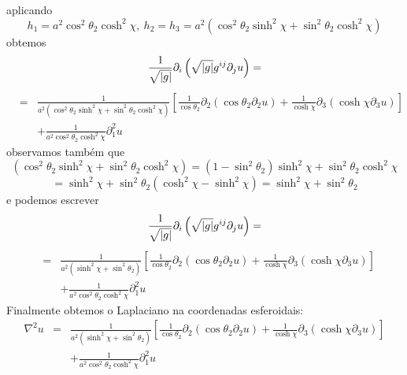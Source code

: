 \documentclass[a4paper,12pt]{article}
\begin{document}
aplicando 
\begin{equation*}
h_{1}=a^{2}\cos ^{2}\theta _{2}\cosh ^{2}\chi ,\ h_{2}=h_{3}=a^{2}\left(
\cos ^{2}\theta _{2}\sinh ^{2}\chi +\sin ^{2}\theta _{2}\cosh ^{2}\chi
\right) 
\end{equation*}%
obtemos%
\begin{equation*}
\frac{1}{\sqrt{\left\vert g\right\vert }}\partial _{i}\left( \sqrt{%
\left\vert g\right\vert }g^{ij}\partial _{j}u\right) =
\end{equation*}%
\begin{eqnarray*}
&=&\frac{1}{a^{2}\left( \cos ^{2}\theta _{2}\sinh ^{2}\chi +\sin ^{2}\theta
_{2}\cosh ^{2}\chi \right) }\left[ \frac{1}{\cos \theta _{2}}\partial
_{2}\left( \cos \theta _{2}\partial _{2}u\right) +\frac{1}{\cosh \chi }%
\partial _{3}\left( \cosh \chi \partial _{3}u\right) \right]  \\
&&+\frac{1}{a^{2}\cos ^{2}\theta _{2}\cosh ^{2}\chi }\partial _{1}^{2}u
\end{eqnarray*}%
observamos tamb\'{e}m que 
\begin{equation*}
\left( \cos ^{2}\theta _{2}\sinh ^{2}\chi +\sin ^{2}\theta _{2}\cosh
^{2}\chi \right) =\left( 1-\sin ^{2}\theta _{2}\right) \sinh ^{2}\chi +\sin
^{2}\theta _{2}\cosh ^{2}\chi 
\end{equation*}%
\begin{equation*}
=\sinh ^{2}\chi +\sin ^{2}\theta _{2}\left( \cosh ^{2}\chi -\sinh ^{2}\chi
\right) =\sinh ^{2}\chi +\sin ^{2}\theta _{2}
\end{equation*}%
e podemos escrever%
\begin{equation*}
\frac{1}{\sqrt{\left\vert g\right\vert }}\partial _{i}\left( \sqrt{%
\left\vert g\right\vert }g^{ij}\partial _{j}u\right) =
\end{equation*}%
\begin{eqnarray*}
&=&\frac{1}{a^{2}\left( \sinh ^{2}\chi +\sin ^{2}\theta _{2}\right) }\left[ 
\frac{1}{\cos \theta _{2}}\partial _{2}\left( \cos \theta _{2}\partial
_{2}u\right) +\frac{1}{\cosh \chi }\partial _{3}\left( \cosh \chi \partial
_{3}u\right) \right]  \\
&&+\frac{1}{a^{2}\cos ^{2}\theta _{2}\cosh ^{2}\chi }\partial _{1}^{2}u
\end{eqnarray*}%
Finalmente obtemos o Laplaciano na coordenadas esferoidais:%
\begin{eqnarray*}
\nabla ^{2}u &=&\frac{1}{a^{2}\left( \sinh ^{2}\chi +\sin ^{2}\theta
_{2}\right) }\left[ \frac{1}{\cos \theta _{2}}\partial _{2}\left( \cos
\theta _{2}\partial _{2}u\right) +\frac{1}{\cosh \chi }\partial _{3}\left(
\cosh \chi \partial _{3}u\right) \right]  \\
&&+\frac{1}{a^{2}\cos ^{2}\theta _{2}\cosh ^{2}\chi }\partial _{1}^{2}u
\end{eqnarray*}%
\end{document}
